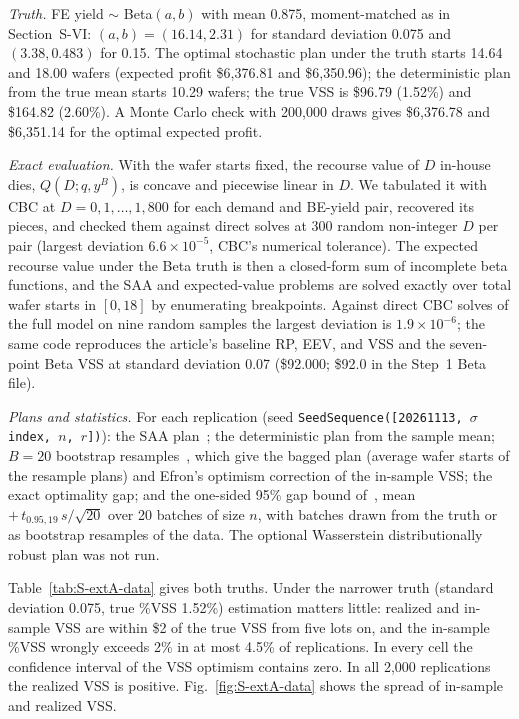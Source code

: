 \emph{Truth.} FE yield $\sim$ Beta$(a,b)$ with mean 0.875, moment-matched as in Section~\mbox{S-VI}: $(a,b)=(16.14,2.31)$ for standard deviation 0.075 and $(3.38,0.483)$ for 0.15. The optimal stochastic plan under the truth starts 14.64 and 18.00 wafers (expected profit \$6{,}376.81 and \$6{,}350.96); the deterministic plan from the true mean starts 10.29 wafers; the true VSS is \$96.79 (1.52\%) and \$164.82 (2.60\%). A Monte Carlo check with 200{,}000 draws gives \$6{,}376.78 and \$6{,}351.14 for the optimal expected profit.

\emph{Exact evaluation.} With the wafer starts fixed, the recourse value of $D$ in-house dies, $Q(D;q,y^B)$, is concave and piecewise linear in $D$. We tabulated it with CBC at $D=0,1,\dots,1{,}800$ for each demand and BE-yield pair, recovered its pieces, and checked them against direct solves at 300 random non-integer $D$ per pair (largest deviation $6.6\times10^{-5}$, CBC's numerical tolerance). The expected recourse value under the Beta truth is then a closed-form sum of incomplete beta functions, and the SAA and expected-value problems are solved exactly over total wafer starts in $[0,18]$ by enumerating breakpoints. Against direct CBC solves of the full model on nine random samples the largest deviation is $1.9\times10^{-6}$; the same code reproduces the article's baseline RP, EEV, and VSS and the seven-point Beta VSS at standard deviation 0.07 (\$92.000; \$92.0 in the Step~1 Beta file).

\emph{Plans and statistics.} For each replication (seed \texttt{SeedSequence([20261113, $\sigma$ index, $n$, $r$])}): the SAA plan~\cite{kleywegt2002}; the deterministic plan from the sample mean; $B=20$ bootstrap resamples~\cite{efron1993bootstrap}, which give the bagged plan (average wafer starts of the resample plans) and Efron's optimism correction of the in-sample VSS; the exact optimality gap; and the one-sided 95\% gap bound of~\cite{mak1999monte,bayraksan2006assessing}, mean $+\,t_{0.95,19}\,s/\sqrt{20}$ over 20 batches of size $n$, with batches drawn from the truth or as bootstrap resamples of the data. The optional Wasserstein distributionally robust plan was not run.

Table~\ref{tab:S-extA-data} gives both truths. Under the narrower truth (standard deviation 0.075, true \%VSS 1.52\%) estimation matters little: realized and in-sample VSS are within \$2 of the true VSS from five lots on, and the in-sample \%VSS wrongly exceeds 2\% in at most 4.5\% of replications. In every cell the confidence interval of the VSS optimism contains zero. In all 2{,}000 replications the realized VSS is positive. Fig.~\ref{fig:S-extA-data} shows the spread of in-sample and realized VSS.


